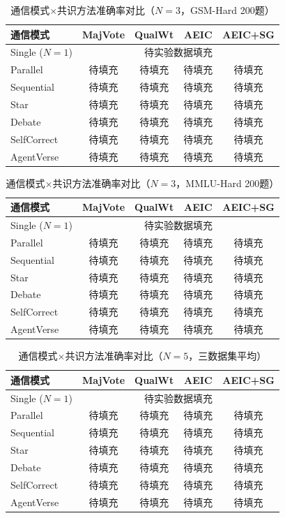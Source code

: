 \documentclass[12pt,a4paper,UTF8,fontset=fandol]{ctexart}
\begin{document}
\begin{table}[H]
\centering
\caption{通信模式$\times$共识方法准确率对比（$N=3$，GSM-Hard 200题）}\label{tab:exp1_gsm}
\begin{tabular}{lcccc}
\toprule
通信模式 & MajVote & QualWt & AEIC & AEIC+SG \\
\midrule
Single ($N=1$) & \multicolumn{4}{c}{待实验数据填充} \\
Parallel & 待填充 & 待填充 & 待填充 & 待填充 \\
Sequential & 待填充 & 待填充 & 待填充 & 待填充 \\
Star & 待填充 & 待填充 & 待填充 & 待填充 \\
Debate & 待填充 & 待填充 & 待填充 & 待填充 \\
SelfCorrect & 待填充 & 待填充 & 待填充 & 待填充 \\
AgentVerse & 待填充 & 待填充 & 待填充 & 待填充 \\
\bottomrule
\end{tabular}
\end{table}

\begin{table}[H]
\centering
\caption{通信模式$\times$共识方法准确率对比（$N=3$，MMLU-Hard 200题）}\label{tab:exp1_mmlu}
\begin{tabular}{lcccc}
\toprule
通信模式 & MajVote & QualWt & AEIC & AEIC+SG \\
\midrule
Single ($N=1$) & \multicolumn{4}{c}{待实验数据填充} \\
Parallel & 待填充 & 待填充 & 待填充 & 待填充 \\
Sequential & 待填充 & 待填充 & 待填充 & 待填充 \\
Star & 待填充 & 待填充 & 待填充 & 待填充 \\
Debate & 待填充 & 待填充 & 待填充 & 待填充 \\
SelfCorrect & 待填充 & 待填充 & 待填充 & 待填充 \\
AgentVerse & 待填充 & 待填充 & 待填充 & 待填充 \\
\bottomrule
\end{tabular}
\end{table}

\begin{table}[H]
\centering
\caption{通信模式$\times$共识方法准确率对比（$N=5$，三数据集平均）}\label{tab:exp1_5a}
\begin{tabular}{lcccc}
\toprule
通信模式 & MajVote & QualWt & AEIC & AEIC+SG \\
\midrule
Single ($N=1$) & \multicolumn{4}{c}{待实验数据填充} \\
Parallel & 待填充 & 待填充 & 待填充 & 待填充 \\
Sequential & 待填充 & 待填充 & 待填充 & 待填充 \\
Star & 待填充 & 待填充 & 待填充 & 待填充 \\
Debate & 待填充 & 待填充 & 待填充 & 待填充 \\
SelfCorrect & 待填充 & 待填充 & 待填充 & 待填充 \\
AgentVerse & 待填充 & 待填充 & 待填充 & 待填充 \\
\bottomrule
\end{tabular}
\end{table}
\end{document}

